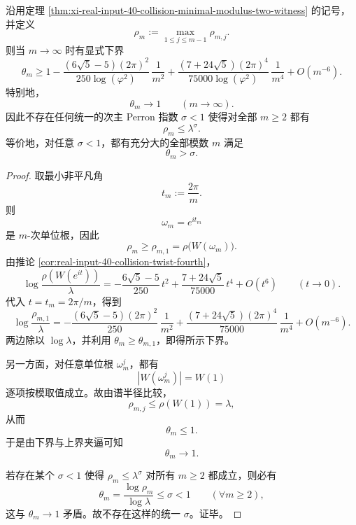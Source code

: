 \begin{theorem}\label{thm:xi-real-input-40-collision-worst-twist-exponent-tends-to-one}
沿用定理 \ref{thm:xi-real-input-40-collision-minimal-modulus-two-witness} 的记号，并定义
\[
\rho_m:=\max_{1\le j\le m-1}\rho_{m,j}.
\]
则当 \(m\to\infty\) 时有显式下界
\[
\boxed{\;
\theta_m
\ge
1-
\frac{(6\sqrt5-5)(2\pi)^2}{250\log(\varphi^2)}\,\frac1{m^2}
+
\frac{(7+24\sqrt5)(2\pi)^4}{75000\log(\varphi^2)}\,\frac1{m^4}
+
O(m^{-6}).\;}
\]
特别地，
\[
\theta_m\longrightarrow 1
\qquad (m\to\infty).
\]
因此不存在任何统一的次主 Perron 指数 \(\sigma<1\) 使得对全部 \(m\ge 2\) 都有
\[
\rho_m\le \lambda^\sigma.
\]
等价地，对任意 \(\sigma<1\)，都有充分大的全部模数 \(m\) 满足
\[
\theta_m>\sigma.
\]
\end{theorem}
\begin{proof}
取最小非平凡角
\[
t_m:=\frac{2\pi}{m}.
\]
则
\[
\omega_m=e^{it_m}
\]
是 \(m\)-次单位根，因此
\[
\rho_m\ge \rho_{m,1}=\rho\!\bigl(W(\omega_m)\bigr).
\]
由推论 \ref{cor:real-input-40-collision-twist-fourth}，
\[
\log\frac{\rho(W(e^{it}))}{\lambda}
=
-\frac{6\sqrt5-5}{250}\,t^2
+\frac{7+24\sqrt5}{75000}\,t^4
+O(t^6)
\qquad (t\to 0).
\]
代入 \(t=t_m=2\pi/m\)，得到
\[
\log\frac{\rho_{m,1}}{\lambda}
=
-\frac{(6\sqrt5-5)(2\pi)^2}{250}\,\frac1{m^2}
+\frac{(7+24\sqrt5)(2\pi)^4}{75000}\,\frac1{m^4}
+O(m^{-6}).
\]
两边除以 \(\log\lambda\)，并利用 \(\theta_m\ge \theta_{m,1}\)，即得所示下界。

另一方面，对任意单位根 \(\omega_m^j\)，都有
\[
|W(\omega_m^j)|=W(1)
\]
逐项按模取值成立。故由谱半径比较，
\[
\rho_{m,j}\le \rho(W(1))=\lambda,
\]
从而
\[
\theta_m\le 1.
\]
于是由下界与上界夹逼可知
\[
\theta_m\to 1.
\]

若存在某个 \(\sigma<1\) 使得 \(\rho_m\le \lambda^\sigma\) 对所有 \(m\ge 2\) 都成立，则必有
\[
\theta_m=\frac{\log\rho_m}{\log\lambda}\le \sigma<1
\qquad(\forall m\ge 2),
\]
这与 \(\theta_m\to 1\) 矛盾。故不存在这样的统一 \(\sigma\)。证毕。
\end{proof}
